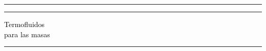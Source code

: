 \begin{titlepage} 

%


    \selectfont %
    \BgThispage
    
	\centering %
	
	
	\rule{\textwidth}{1pt} %
	
	\vspace{2pt}\vspace{-\baselineskip} %
	
	\rule{\textwidth}{0.4pt} %
	
	\vspace{0.1\textheight} %
	
	
	\textcolor{black}{ %
		{\Huge Termofluidos}\\[1.5\baselineskip] %
		{\Large para las masas} %
	}
	
	\vspace{0.025\textheight} %
	
	\rule{0.3\textwidth}{0.4pt} %
	
	\vspace{0.1\textheight} %
	
	
	\vspace{3cm}
    


	\vfill %
	
    
	

\end{titlepage}
